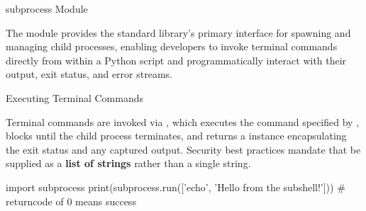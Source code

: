 \documentclass[10pt]{article}
\begin{document}
    \begin{core}{subprocess Module}

      The \href{https://docs.python.org/3/library/subprocess.html#module-subprocess}{} module provides the standard library's primary interface for spawning and managing child processes, enabling developers to invoke terminal commands directly from within a Python script and programmatically interact with their output, exit status, and error streams.

    \end{core}

    \begin{core}{Executing Terminal Commands}

      Terminal commands are invoked via , which executes the command specified by , blocks until the child process terminates, and returns a  instance encapsulating the exit status and any captured output. Security best practices mandate that  be supplied as a \textbf{list of strings} rather than a single string.

      \begin{pyconsole}

        import subprocess
        print(subprocess.run(['echo', 'Hello from the subshell!'])) # returncode of 0 means success

      \end{pyconsole}

    \end{core}
\end{document}
